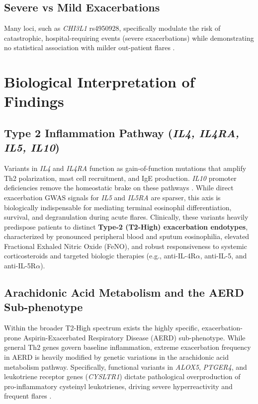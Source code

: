 \documentclass[11pt,a4paper]{article}
\begin{document}
\subsection{Severe vs Mild Exacerbations}
Many loci, such as \textit{CHI3L1} rs4950928, specifically modulate the risk of catastrophic, hospital-requiring events (severe exacerbations) while demonstrating no statistical association with milder out-patient flares \cite{ParkTantisira2017, RamphulLo2021}.

\section{Biological Interpretation of Findings}

\subsection{Type 2 Inflammation Pathway (\textit{IL4, IL4RA, IL5, IL10})}
Variants in \textit{IL4} and \textit{IL4RA} function as gain-of-function mutations that amplify Th2 polarization, mast cell recruitment, and IgE production. \textit{IL10} promoter deficiencies remove the homeostatic brake on these pathways \cite{MasoodOthman2025, RamachandraDavoodi2015}. While direct exacerbation GWAS signals for \textit{IL5} and \textit{IL5RA} are sparser, this axis is biologically indispensable for mediating terminal eosinophil differentiation, survival, and degranulation during acute flares. Clinically, these variants heavily predispose patients to distinct \textbf{Type-2 (T2-High) exacerbation endotypes}, characterized by pronounced peripheral blood and sputum eosinophilia, elevated Fractional Exhaled Nitric Oxide (FeNO), and robust responsiveness to systemic corticosteroids and targeted biologic therapies (e.g., anti-IL-4R$\alpha$, anti-IL-5, and anti-IL-5R$\alpha$).

\subsection{Arachidonic Acid Metabolism and the AERD Sub-phenotype}
Within the broader T2-High spectrum exists the highly specific, exacerbation-prone Aspirin-Exacerbated Respiratory Disease (AERD) sub-phenotype. While general Th2 genes govern baseline inflammation, extreme exacerbation frequency in AERD is heavily modified by genetic variations in the arachidonic acid metabolism pathway. Specifically, functional variants in \textit{ALOX5}, \textit{PTGER4}, and leukotriene receptor genes (\textit{CYSLTR1}) dictate pathological overproduction of pro-inflammatory cysteinyl leukotrienes, driving severe hyperreactivity and frequent flares \cite{HerreraLuisOrtega2022}.
\end{document}
